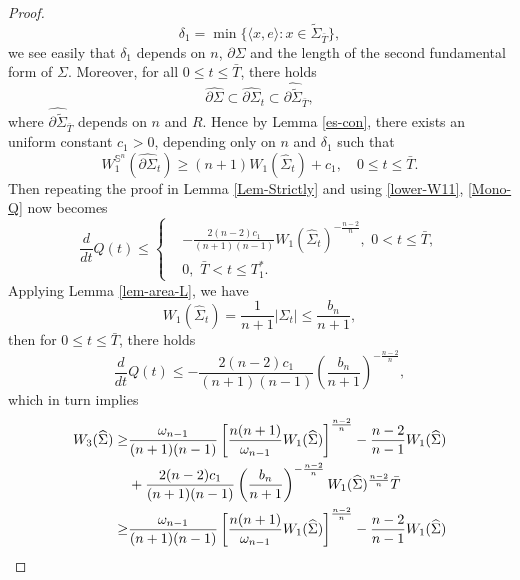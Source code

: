 \documentclass[11pt,reqno]{amsart}
\theoremstyle{definition}
\theoremstyle{remark}
\numberwithin{equation}{section}
\renewcommand{\(}{\left(}
\renewcommand{\)}{\right)}
\renewcommand{\widetilde}{\tilde}
\renewcommand{\-}{\overline}
\begin{document}
\begin{proof}
	\begin{equation}\label{Choice-delta1}
		\delta_1=\min\{\langle x,e\rangle:x\in\widetilde{\Sigma}_{\bar{T}}\},
	\end{equation}
	we see easily that $\delta_1$ depends on $n$, $\partial\Sigma$ and the length of the second fundamental form of $\Sigma$. Moreover, for all $0\leq t\leq \bar{T}$, there holds
	\begin{equation}
		\widehat{\partial\Sigma}\subset\widehat{\partial\Sigma}_t\subset\widehat{\partial\tilde{\Sigma}}_{\bar{T}},
	\end{equation}
	where $\widehat{\partial\tilde{\Sigma}}_{\bar{T}}$ depends on $n$ and $R$. Hence by Lemma \ref{es-con}, there exists an uniform constant $c_1>0$, depending only on $n$ and $\delta_1$ such that 
	\begin{equation}\label{lower-W11}
		W_1^{\mathbb{S}^n}(\widehat{\partial\Sigma}_t)\geq (n+1)W_1(\widehat{\Sigma}_t)+c_1,\quad 0\leq t \leq \bar{T}.
	\end{equation}
	Then repeating the proof in Lemma \ref{Lem-Strictly} and using \eqref{lower-W11}, \eqref{Mono-Q} now becomes
	\begin{equation}\label{M-Q}
		\frac{d}{dt}Q(t)\leq \left\{\begin{aligned}
			&-\frac{2(n-2)c_1}{(n+1)(n-1)}W_1(\widehat{\Sigma}_t)^{-\frac{n-2}{n}},\,\,0<t\leq \bar{T},\\
			&0,\,\, \bar{T}<t\leq T_1^{*}.
		\end{aligned}\right.
	\end{equation}
	Applying Lemma \ref{lem-area-L}, we have
	\begin{equation*}
		W_1(\widehat{\Sigma}_t)=\frac{1}{n+1}|\Sigma_t|\leq \frac{b_n}{n+1},
	\end{equation*}
	then  for $0\leq t \leq \bar{T}$, there holds
	\begin{equation}\label{In-Q}
		\frac{d}{dt}Q(t)\leq -\frac{2(n-2)c_1}{(n+1)(n-1)}\left(\frac{b_n}{n+1}\right)^{-\frac{n-2}{n}},
	\end{equation}
	which in turn implies 
	\begin{align}
		W_3(\widehat{\Sigma})\geq& \frac{\omega_{n-1}}{(n+1)(n-1)}\left[\frac{n(n+1)}{\omega_{n-1}}W_1(\widehat{\Sigma})\right]^{\frac{n-2}{n}}-\frac{n-2}{n-1}W_1(\widehat{\Sigma})\notag\\
		&+\frac{2(n-2)c_1}{(n+1)(n-1)}\left(\frac{b_n}{n+1}\right)^{-\frac{n-2}{n}}W_1(\widehat{\Sigma})^{\frac{n-2}{n}}\bar{T}\notag\\
		\geq&\frac{\omega_{n-1}}{(n+1)(n-1)}\left[\frac{n(n+1)}{\omega_{n-1}}W_1(\widehat{\Sigma})\right]^{\frac{n-2}{n}}-\frac{n-2}{n-1}W_1(\widehat{\Sigma})\notag\\

\end{align}
\end{proof}
\end{document}
